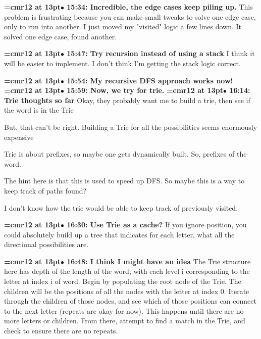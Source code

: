{\smallskip\noindent\bf\font\titlefont=cmr12 at 13pt\titlefont $\bullet$ 15:34: Incredible, the edge cases keep piling up.}\smallskip
This problem is frustrating because you can make small tweaks to solve one edge case, only to run into another. I just moved my "visited" logic a few lines down. It solved one edge case, found another.
\par

{\smallskip\noindent\bf\font\titlefont=cmr12 at 13pt\titlefont $\bullet$ 15:47: Try recursion instead of using a stack}\smallskip
I think it will be easier to implement. I don't think I'm getting the stack logic correct.
\par

{\smallskip\noindent\bf\font\titlefont=cmr12 at 13pt\titlefont $\bullet$ 15:54: My recursive DFS approach works now!}\smallskip
{\smallskip\noindent\bf\font\titlefont=cmr12 at 13pt\titlefont $\bullet$ 15:59: Now, we try for trie.}\smallskip
{\smallskip\noindent\bf\font\titlefont=cmr12 at 13pt\titlefont $\bullet$ 16:14: Trie thoughts so far}\smallskip
Okay, they probably want me to build a trie, then see if the word is in the Trie
\par

But, that can't be right. Building a Trie for all the possibilities seems enormously expensive
\par

Trie is about prefixes, so maybe one gets dynamically built. So, prefixes of the word.
\par

The hint here is that this is used to speed up DFS. So maybe this is a way to keep track of paths found?
\par

I don't know how the trie would be able to keep track of previously visited.
\par

{\smallskip\noindent\bf\font\titlefont=cmr12 at 13pt\titlefont $\bullet$ 16:30: Use Trie as a cache?}\smallskip
If you ignore position, you could absolutely build up a tree that indicates for each letter, what all the directional possibilities are.
\par

{\smallskip\noindent\bf\font\titlefont=cmr12 at 13pt\titlefont $\bullet$ 16:48: I think I might have an idea}\smallskip
The Trie structure here has depth of the length of the word, with each level i corresponding to the letter at index i of word. Begin by populating the root node of the Trie. The children will be the positions of all the nodes with the letter at index 0. Iterate through the children of those nodes, and see which of those positions can connect to the next letter (repeats are okay for now). This happens until there are no more letters or children. From there, attempt to find a match in the Trie, and check to ensure there are no repeats.
\par

